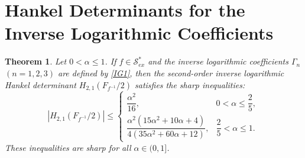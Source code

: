 \documentclass[10pt,a4paper]{amsart}
\newtheorem{theo}{Theorem}[section]
\numberwithin{equation}{section}
\begin{document}
\section{Hankel Determinants for the Inverse Logarithmic Coefficients}

\begin{theo}\label{T3}
Let $0<\alpha\le 1$. If $f\in \mathcal{S}_{ex}^{\ast}$ and the inverse logarithmic coefficients $\Gamma_n$ $(n=1,2,3)$ are defined by \eqref{IG1}, then the second-order inverse logarithmic Hankel determinant $H_{2,1}(F_{f^{-1}}/2)$ satisfies the sharp inequalities:
\begin{equation}\label{ND18}
\left| H_{2,1}\left(F_{f^{-1}}/2\right)\right| \le
\begin{cases}
\dfrac{\alpha^2}{16}, & 0<\alpha\le \dfrac25,\\[8pt]
\dfrac{\alpha^2(15\alpha^2+10\alpha+4)}{4(35\alpha^2+60\alpha+12)}, & \dfrac25<\alpha\le 1.
\end{cases}
\end{equation}
These inequalities are sharp for all $\alpha\in(0,1]$.
\end{theo}
\end{document}
